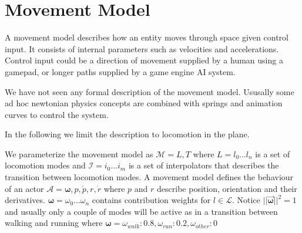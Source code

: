 \section{Movement Model}
A movement model describes how an entity moves through space given control input. It consists of internal parameters such as velocities and accelerations. Control input could be a direction of movement supplied by a human using a gamepad, or longer paths supplied by a game engine AI system.

We have not seen any formal description of the movement model. Ususally some ad hoc newtonian physics concepts are combined with springs and animation curves to control the system.

In the following we limit the description to locomotion in the plane. 

We parameterize the movement model as $\mathcal{M}=L,T$ where $L=l_0 \ldots l_n$ is a set of locomotion modes and $\mathcal{I}=i_0 \ldots i_m$ is a set of interpolators that describes the transition between locomotion modes. A movement model defines the behaviour of an actor $\mathcal{A}=\boldsymbol{\omega},p,\dot{p},r,\dot{r}$ where $p$ and $r$ describe position, orientation and their derivatives.  $\boldsymbol{\omega}=\omega_0 \ldots \omega_n$ contains contribution weights for $l \in \mathcal{L}$. Notice $||\vec{\boldsymbol{\omega}}||^2=1$ and usually only a couple of modes will be active as in a transition between walking and running where $\boldsymbol{\omega}=\omega_{walk}:0.8, \omega_{run}:{0.2}, \omega_{other}:0$

